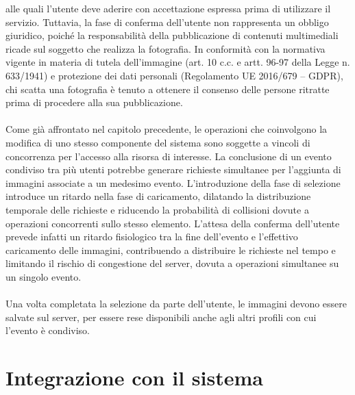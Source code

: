 alle quali l'utente deve aderire con accettazione espressa prima di utilizzare il servizio. 
Tuttavia, la fase di conferma dell'utente non rappresenta un obbligo giuridico, 
poiché la responsabilità della pubblicazione di contenuti multimediali 
ricade sul soggetto che realizza la fotografia. 
In conformità con la normativa vigente in materia di tutela dell'immagine 
(art. 10 c.c. e artt. 96-97 della Legge n. 633/1941) e protezione dei dati personali (Regolamento UE 2016/679 – GDPR), 
chi scatta una fotografia è tenuto a ottenere il consenso delle persone ritratte 
prima di procedere alla sua pubblicazione.\\
\\
Come già affrontato nel capitolo precedente, 
le operazioni che coinvolgono la modifica di uno stesso componente del sistema 
sono soggette a vincoli di concorrenza per l'accesso alla risorsa di interesse. 
La conclusione di un evento condiviso tra più utenti 
potrebbe generare richieste simultanee per l'aggiunta di immagini associate a un medesimo evento. 
L'introduzione della fase di selezione introduce un ritardo nella fase di caricamento, 
dilatando la distribuzione temporale delle richieste e riducendo la probabilità di collisioni 
dovute a operazioni concorrenti sullo stesso elemento.
L'attesa della conferma dell'utente prevede infatti un ritardo fisiologico 
tra la fine dell'evento e l'effettivo caricamento delle immagini, 
contribuendo a distribuire le richieste nel tempo e 
limitando il rischio di congestione del server, 
dovuta a operazioni simultanee su un singolo evento.\\
\\
Una volta completata la selezione da parte dell'utente, 
le immagini devono essere salvate sul server, 
per essere rese disponibili anche agli altri profili con cui l'evento è condiviso.
\clearpage
\section{Integrazione con il sistema}

